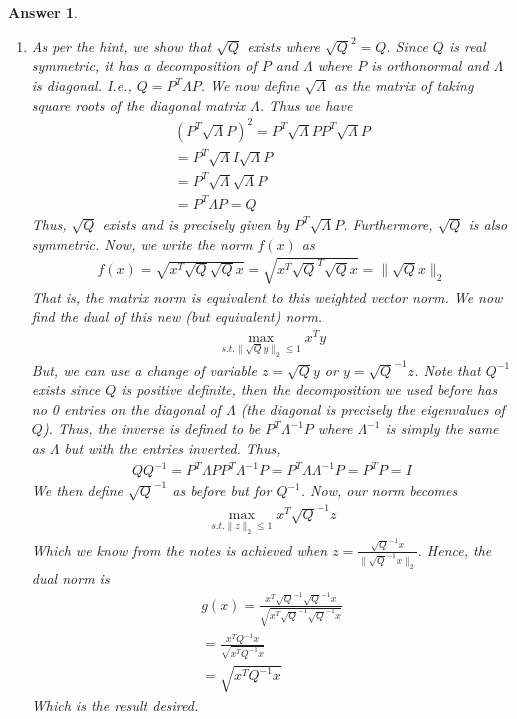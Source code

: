\documentclass[12pt]{article}
\theoremstyle{colon}
\newtheorem*{answer}{Answer}
\begin{document}
\begin{answer}
\begin{enumerate}[label=\arabic*)]
    \item As per the hint, we show that $\sqrt{Q}$ exists where $\sqrt{Q}^2 = Q$. Since $Q$ is real symmetric, it has a decomposition of $P$ and $\Lambda$ where $P$ is orthonormal and $\Lambda$ is diagonal. I.e., $Q = P^T \Lambda P$. We now define $\sqrt{\Lambda}$ as the matrix of taking square roots of the diagonal matrix $\Lambda$. Thus we have
      \begin{gather*}
        (P^T \sqrt{\Lambda} P)^2 = P^T \sqrt{\Lambda} P P^T \sqrt{\Lambda} P \\
        = P^T \sqrt{\Lambda} I \sqrt{\Lambda} P \\
        = P^T \sqrt{\Lambda} \sqrt{\Lambda} P \\
        = P^T \Lambda P = Q
      \end{gather*}
      Thus, $\sqrt{Q}$ exists and is precisely given by $P^T \sqrt{\Lambda} P$. Furthermore, $\sqrt{Q}$ is also symmetric. Now, we write the norm $f(x)$ as
      \begin{gather*}
        f(x) = \sqrt{x^T \sqrt{Q} \sqrt{Q} x} = \sqrt{x^T \sqrt{Q}^T \sqrt{Q} x} = \lVert \sqrt{Q} x \rVert_2
      \end{gather*}
      That is, the matrix norm is equivalent to this weighted vector norm. We now find the dual of this new (but equivalent) norm.
      \begin{gather*}
        \max_{s.t. \lVert \sqrt{Q} y \rVert_2 \leq 1} x^T y
      \end{gather*}
      But, we can use a change of variable $z = \sqrt{Q} y$ or $y = \sqrt{Q}^{-1} z$. Note that $Q^{-1}$ exists since $Q$ is positive definite, then the decomposition we used before has no 0 entries on the diagonal of $\Lambda$ (the diagonal is precisely the eigenvalues of $Q$). Thus, the inverse is defined to be $P^T \Lambda^{-1} P$ where $\Lambda^{-1}$ is simply the same as $\Lambda$ but with the entries inverted. Thus,
      \begin{gather*}
        Q Q^{-1} = P^T \Lambda P P^T \Lambda^{-1} P = P^T \Lambda \Lambda^{-1} P = P^T P = I
      \end{gather*}
      We then define $\sqrt{Q}^{-1}$ as before but for $Q^{-1}$. Now, our norm becomes
      \begin{gather*}
        \max_{s.t. \lVert z \rVert_2 \leq 1} x^T \sqrt{Q}^{-1} z
      \end{gather*}
      Which we know from the notes is achieved when $z = \frac{\sqrt{Q}^{-1} x}{\lVert \sqrt{Q}^{-1} x \rVert_2}$. Hence, the dual norm is
      \begin{gather*}
        g(x) = \frac{x^T \sqrt{Q}^{-1} \sqrt{Q}^{-1} x}{\sqrt{x^T \sqrt{Q}^{-1} \sqrt{Q}^{-1} x}} \\
        = \frac{x^T Q^{-1} x}{\sqrt{x^T Q^{-1} x}} \\
        = \sqrt{x^T Q^{-1} x}
      \end{gather*}
      Which is the result desired.


\end{enumerate}
\end{answer}
\end{document}
